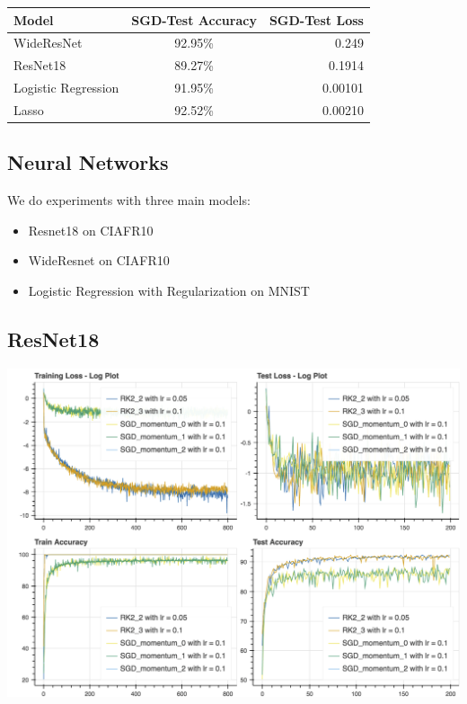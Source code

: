 \documentclass[a0,portrait]{a0poster}
\begin{document}
\begin{multicols}{3}
\begin{center}
  \begin{tabular}{ | l | c | r| }
    \hline
    Model & SGD-Test Accuracy & SGD-Test Loss \\ \hline
    WideResNet & 92.95\% & 0.249 \\ \hline
    ResNet18  & 89.27\% & 0.1914 \\ \hline
    Logistic Regression & 91.95\% & 0.00101 \\ \hline
    Lasso & 92.52\% & 0.00210  \\ \hline
    \hline
  \end{tabular}
\end{center}

\subsection*{Neural Networks}
We do experiments with three main models:
\begin{itemize}
\item Resnet18 on CIAFR10
\item WideResnet on CIAFR10
\item Logistic Regression with Regularization on MNIST
\end{itemize}

\subsection*{ResNet18}
\begin{center}\vspace{1cm}
\includegraphics[width=0.8\linewidth]{../plots/inf_plots/resnet_sgd_rk2.png}
\end{center}%


\end{multicols}
\end{document}

